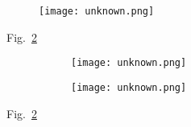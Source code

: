 \begin{figure}[htbp]
    \centering
    \texttt{[image: unknown.png]}
    \caption[]{}
    \label{fig:add_label}
\end{figure}
Fig.~\ref{fig:add_label}

\begin{figure}[htbp]
    \centering
    \begin{subfigure}[0.5\textwidth]
        \centering
        \texttt{[image: unknown.png]}
        \caption{}
    \end{subfigure}
    \hfill
    \begin{subfigure}[0.5\textwidth]
        \centering
        \texttt{[image: unknown.png]}
        \caption{}
    \end{subfigure}
    \caption[]{}
    \label{fig:add_label}
\end{figure}
Fig.~\ref{fig:add_label}

